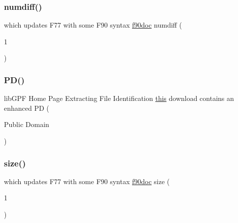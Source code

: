 \mbox{\label{what__overview_81_8txt_a7d9f0f7f68d767709cf298ae59490237}} 
\subsubsection{\texorpdfstring{numdiff()}{numdiff()}}
{\footnotesize\ttfamily which updates F77 with some F90 syntax \hyperlink{what__overview_81_8txt_aab2f56fdcdfab484c0d861985675a92f}{f90doc} numdiff (\begin{DoxyParamCaption}\item[{1}]{ }\end{DoxyParamCaption})}

\mbox{\label{what__overview_81_8txt_a85f26da5a4481fbdb0d9c79f2b94de3e}} 
\subsubsection{\texorpdfstring{P\+D()}{PD()}}
{\footnotesize\ttfamily lib\+G\+PF Home Page Extracting File Identification \hyperlink{M__stopwatch_83_8txt_ad62a52042bb610eee5b36b5516caec22}{this} download contains an enhanced PD (\begin{DoxyParamCaption}\item[{Public}]{Domain }\end{DoxyParamCaption})}

\mbox{\label{what__overview_81_8txt_ab5692ed87074f1d5ec850a9ffa8b5af9}} 
\subsubsection{\texorpdfstring{size()}{size()}}
{\footnotesize\ttfamily which updates F77 with some F90 syntax \hyperlink{what__overview_81_8txt_aab2f56fdcdfab484c0d861985675a92f}{f90doc} size (\begin{DoxyParamCaption}\item[{1}]{ }\end{DoxyParamCaption})}

